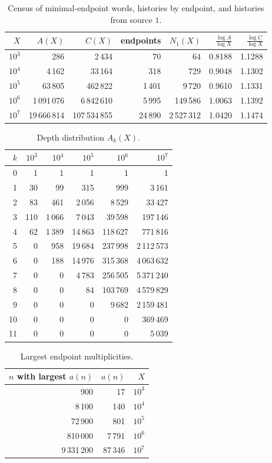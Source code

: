 \documentclass[11pt,a4paper]{article}
\begin{document}
\begin{table}[htbp]\centering\small
\begin{tabular}{rrrrrrr}\toprule
$X$ & $A(X)$ & $C(X)$ & endpoints & $N_1(X)$ & $\frac{\log A}{\log X}$ & $\frac{\log C}{\log X}$\\\midrule
$10^{3}$ & 286 & 2\,434 & 70 & 64 & 0.8188 & 1.1288\\
$10^{4}$ & 4\,162 & 33\,164 & 318 & 729 & 0.9048 & 1.1302\\
$10^{5}$ & 63\,805 & 462\,822 & 1\,401 & 9\,720 & 0.9610 & 1.1331\\
$10^{6}$ & 1\,091\,076 & 6\,842\,610 & 5\,995 & 149\,586 & 1.0063 & 1.1392\\
$10^{7}$ & 19\,666\,814 & 107\,534\,855 & 24\,890 & 2\,527\,312 & 1.0420 & 1.1474\\\bottomrule
\end{tabular}
\caption{Census of minimal-endpoint words, histories by endpoint, and histories from source $1$.}\label{tab:census}
\end{table}
\begin{table}[htbp]\centering\small
\begin{tabular}{rrrrrr}\toprule
$k$ & $10^{3}$ & $10^{4}$ & $10^{5}$ & $10^{6}$ & $10^{7}$\\\midrule
0 & 1 & 1 & 1 & 1 & 1\\
1 & 30 & 99 & 315 & 999 & 3\,161\\
2 & 83 & 461 & 2\,056 & 8\,529 & 33\,427\\
3 & 110 & 1\,066 & 7\,043 & 39\,598 & 197\,146\\
4 & 62 & 1\,389 & 14\,863 & 118\,627 & 771\,816\\
5 & 0 & 958 & 19\,684 & 237\,998 & 2\,112\,573\\
6 & 0 & 188 & 14\,976 & 315\,368 & 4\,063\,632\\
7 & 0 & 0 & 4\,783 & 256\,505 & 5\,371\,240\\
8 & 0 & 0 & 84 & 103\,769 & 4\,579\,829\\
9 & 0 & 0 & 0 & 9\,682 & 2\,159\,481\\
10 & 0 & 0 & 0 & 0 & 369\,469\\
11 & 0 & 0 & 0 & 0 & 5\,039\\\bottomrule
\end{tabular}
\caption{Depth distribution $A_k(X)$.}\label{tab:depth}
\end{table}
\begin{table}[htbp]\centering\small
\begin{tabular}{rrr}\toprule
$n$ with largest $a(n)$ & $a(n)$ & $X$\\\midrule
900 & 17 & $10^{3}$\\
8\,100 & 140 & $10^{4}$\\
72\,900 & 801 & $10^{5}$\\
810\,000 & 7\,791 & $10^{6}$\\
9\,331\,200 & 87\,346 & $10^{7}$\\\bottomrule
\end{tabular}
\caption{Largest endpoint multiplicities.}\label{tab:max}
\end{table}
\end{document}
